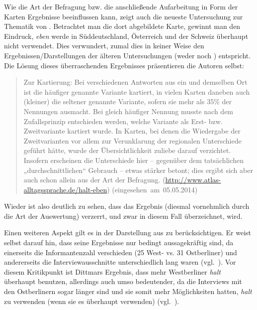 Wie die Art der Befragung bzw. die anschließende Aufarbeitung in Form der Karten Ergebnisse beeinflussen kann, zeigt auch die neueste Untersuchung zur Thematik von \citet{ElspassMoeller2012}. Betrachtet man die dort abgebildete Karte, gewinnt man den Eindruck, \textit{eben} werde in Süddeutschland, Österreich und der Schweiz überhaupt nicht verwendet.
Dies verwundert, zumal dies in keiner Weise den Ergebnissen/Darstellungen der älteren Untersuchungen (weder \citealt{Eichhoff1978} noch \citealt{Elspass2005}) entspricht. Die Lösung dieses überraschenden Ergebnisses präsentieren die Autoren selbst:\largerpage[.5]			
\begin{quotation}														                       Zur Kartierung: Bei verschiedenen Antworten aus ein und demselben Ort ist die häufiger genannte Variante kartiert, in vielen Karten daneben auch (kleiner) die seltener genannte Variante, sofern sie mehr als 35\% der Nennungen ausmacht. Bei gleich häufiger Nennung musste nach dem Zufallsprinzip entschieden werden, welche Variante als Erst- bzw. Zweitvariante kartiert wurde. In Karten, bei denen die Wiedergabe der Zweitvarianten vor allem zur Verunklarung der regionalen Unterschiede geführt hätte, wurde der Übersichtlichkeit zuliebe darauf verzichtet. Insofern erscheinen die Unterschiede hier – gegenüber dem tatsächlichen „durchschnittlichen“ Gebrauch – etwas stärker betont; dies ergibt sich aber auch schon allein aus der Art der Befragung.
\hfill{\scriptsize(\url{http://www.atlas-alltagssprache.de/halt-eben})}
\newline
\hbox{}\hfill\hbox{(eingesehen am 05.05.2014)}
\end{quotation}
Wieder ist also deutlich zu sehen, dass das Ergebnis (diesmal vornehmlich durch die Art der Auswertung) verzerrt, und zwar in diesem Fall überzeichnet, wird.

Einen weiteren Aspekt gilt es in der Darstellung aus \citet{Dittmar2000} zu berücksichtigen. Er weist selbst darauf hin, dass seine Ergebnisse nur bedingt aussagekräftig sind, da einerseits die Informantenzahl verschieden (25 West- vs. 31 Ostberliner) und andererseits die Interviewausschnitte unterschiedlich lang waren (vgl.\ \citealt[222]{Dittmar2000}). Vor diesem Kritikpunkt ist Dittmars Ergebnis, dass mehr Westberliner \textit{halt} überhaupt benutzen, allerdings auch umso bedeutender, da die Interviews mit den Ostberlinern sogar länger sind und sie somit mehr Möglichkeiten hatten, \textit{halt} zu verwenden (wenn sie es überhaupt verwenden) (vgl.\ \citealt[222]{Dittmar2000}).

